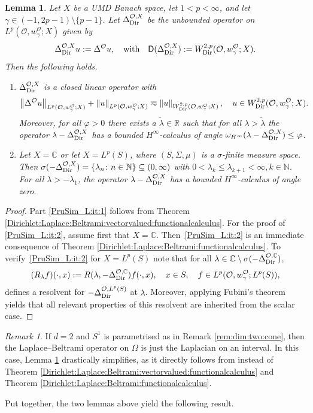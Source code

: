 \documentclass[12pt,a4paper, reqno]{amsart}
\theoremstyle{plain}
\newtheorem{lemma}[theorem]{Lemma}
\theoremstyle{definition}
\theoremstyle{remark}
\newtheorem{remark}[theorem]{Remark}
\numberwithin{equation}{section}
\newcommand{\1}{\mathbbm{1}}
\newcommand{\R}{\ensuremath{\mathbb{R}}}
\newcommand{\N}{\ensuremath{\mathbb{N}}}
\newcommand{\C}{\ensuremath{\mathbb{C}}}
\newcommand{\calO}{\ensuremath{\mathcal{O}}}
\newcommand{\sfD}{\ensuremath{\mathsf{D}}}
\newcommand{\Dir}{\textup{Dir}}
\newcommand{\nrm}[1]{\left\lVert #1 \right\rVert}
\begin{document}
\begin{lemma}\label{PruSim_L}
    Let $X$ be a UMD Banach space, let $1<p<\infty$, and let $\gamma\in(-1,2p-1)\setminus \{p-1\}$. 
    Let $\Delta_\Dir^{\calO,X}$ be the unbounded operator on $L^p(\calO,w_\gamma^\calO;X)$ given by 
    \[\Delta_\Dir^{\calO,X}u:= \Delta^\calO u, \quad\text{with}\quad \sfD(\Delta_\Dir^{\calO,X}):= W^{2,p}_\Dir(\calO,w_\gamma^\calO;X). \]
    Then the following holds.
    \begin{enumerate}[label=\textup{(\roman*)}]
		\item\label{PruSim_L:it:1} $\Delta_\Dir^{\calO,X}$ is a closed linear operator  with
        \[
        \nrm{\Delta^\calO u}_{L^p(\calO,w_\gamma^\calO;X)} + \nrm{u}_{L^p(\calO,w_\gamma^\calO;X)}
        \eqsim
        \nrm{u}_{W^{2,p}_\Dir(\calO,w_\gamma^\calO;X)},
        \quad 
        u\in W^{2,p}_\Dir(\calO,w_\gamma^\calO;X).
        \]
        Moreover, for all $\varphi>0$ there exists a $\tilde{\lambda}\in \R$ such that for all $\lambda>\tilde{\lambda}$ the operator $\lambda-\Delta_\Dir^{\calO,X}$ has a bounded $H^\infty$-calculus of angle $\omega_{H^\infty}(\lambda-\Delta_\Dir^{\calO,X})\le \varphi$.
		\item\label{PruSim_L:it:2} Let $X=\C$ or let $X=L^p(S)$, where $(S,\Sigma,\mu)$ is a $\sigma$-finite measure space.
        Then $\sigma(-\Delta_\Dir^{\calO,X})=\{\lambda_n\colon n\in\N\}\subseteq (0,\infty)$ with $0<\lambda_{k}\le \lambda_{k+1}<\infty, k\in\N.$ For all $\lambda> -\lambda_1$, the operator $\lambda-\Delta_\Dir^{\calO,X}$ has a bounded $H^\infty$-calculus of angle zero. 
        
		\end{enumerate} 
\end{lemma}
\begin{proof}
	Part \ref{PruSim_L:it:1} follows from Theorem \ref{Dirichlet:Laplace:Beltrami:vectorvalued:functionalcalculus}. 
    For the proof of \ref{PruSim_L:it:2}, assume first that $X=\C$. Then~\ref{PruSim_L:it:2} is an immediate consequence of Theorem \ref{Dirichlet:Laplace:Beltrami:functionalcalculus}.
    To verify~\ref{PruSim_L:it:2} for $X=L^p(S)$ note that for all $\lambda\in\C\setminus\sigma(-\Delta_\Dir^{\calO,\C})$, 
    \[
    (R_\lambda f)(\cdot,x) := R(\lambda,-\Delta_\Dir^{\calO,\C})f(\cdot,x), \quad x\in S,\quad f\in L^p(\calO,w_\gamma^\calO;L^p(S)),
    \]
    defines a resolvent for $-\Delta_\Dir^{\calO,L^p(S)}$ at $\lambda$. 
    Moreover, applying Fubini's theorem yields that all relevant properties of this resolvent are inherited from the scalar case.
\end{proof}
\begin{remark}
    If $d=2$ and $S^1$ is parametrised as in Remark \ref{rem:dim:two:cone}, then the Laplace--Beltrami operator on $\Omega$ is just the Laplacian on an interval. In this case, Lemma \ref{PruSim_L} drastically simplifies, as it directly follows from \cite[Theorem 6.1 and Corollary 6.2]{LindemulderVeraar2020} instead of Theorem \ref{Dirichlet:Laplace:Beltrami:vectorvalued:functionalcalculus} and Theorem \ref{Dirichlet:Laplace:Beltrami:functionalcalculus}.
\end{remark}
Put together, the two lemmas above yield the following result.
\end{document}
